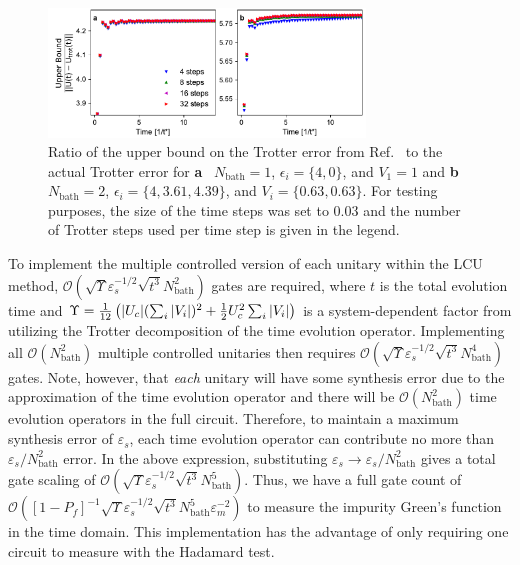 \documentclass[aip,reprint,table,xcdraw,usenames,dvipsnames]{revtex4-1}
\begin{document}
\begin{figure}[t!]
    \centering
    \includegraphics[width=0.75\textwidth, keepaspectratio]{trot_err2.pdf}
    \caption{Ratio of the upper bound on the Trotter error from Ref.~ to the actual Trotter error for \textbf{a} ~$N_\mathrm{bath} = 1$, $\epsilon_i = \{4,0\}$, and $V_1=1$ and \textbf{b}~$N_\mathrm{bath} = 2$, $\epsilon_i = \{4, 3.61, 4.39\}$, and $V_i = \{0.63, 0.63\}$. For testing purposes, the size of the time steps was set to $0.03$ and the number of Trotter steps used per time step is given in the legend.}
    \label{fig:trot}
\end{figure}


To implement the multiple controlled version of each unitary within the LCU method, $\mathcal{O}(\sqrt{\Upsilon}\varepsilon_s^{-1/2} \sqrt{t^3} N_{\text{bath}}^2)$ gates are 
required, where $t$ is the total 
evolution time and $\Upsilon = \frac{1}{12} \left( \abs{ U_c} (\sum_i \abs{V_i})^2 + \frac{1}{2} U_c^2 \sum_i \abs{V_i} \right)$ is a system-dependent factor from utilizing the Trotter decomposition of the time evolution operator. Implementing all $\mathcal{O} (N_{\text{bath}}^2)$ multiple 
controlled unitaries then requires $\mathcal{O}(\sqrt{\Upsilon}\varepsilon_s^{-1/2} 
\sqrt{t^3} N_{\text{bath}}^4)$ gates. Note, however, that  
\emph{each} unitary will have some synthesis error due to the approximation of 
the time evolution operator and there will be $\mathcal{O}(N_{\text{bath}}^2)$
time evolution operators in the full circuit. Therefore, to maintain a maximum synthesis error of $\varepsilon_s$, each time evolution operator can contribute no more than $\varepsilon_s/N_{\text{bath}}^2$ error. In the above expression, substituting 
$\varepsilon_s \to \varepsilon_s/N_{\text{bath}}^2$ gives a total gate scaling of 
$\mathcal{O}(\sqrt{\Upsilon}\varepsilon_s^{-1/2} \sqrt{t^3} N_{\text{bath}}^5)$. Thus, we have a full gate count of $\mathcal{O}([1-P_f]^{-1} \sqrt{\Upsilon} \varepsilon_s^{-1/2} 
\sqrt{t^3} N_{\text{bath}}^5 \varepsilon_m^{-2})$ to measure the impurity 
Green's function in the time domain. This implementation has
the advantage of only requiring one circuit to measure
with the Hadamard test.
\end{document}
